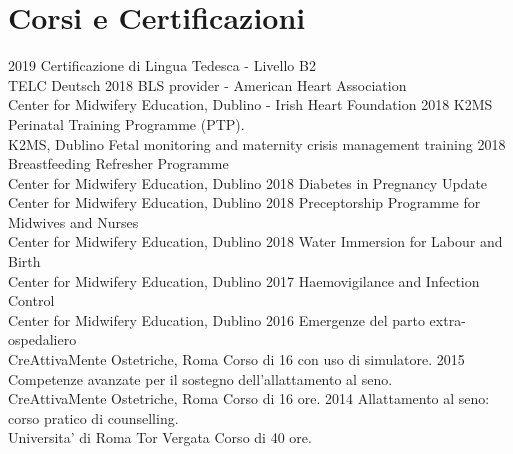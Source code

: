 \documentclass[11pt]{friggeri-cv}
\begin{document}
\section{Corsi e Certificazioni}
\begin{entrylist}
  \entry
    {2019}
    {Certificazione di Lingua Tedesca - Livello B2}
    {\\TELC Deutsch}
    {\vspace{-10pt}}
  \entry
    {2018}
    {BLS provider - American Heart Association}
    {\\Center for Midwifery Education, Dublino - Irish Heart Foundation}
    {\vspace{-10pt}}
  \entry
    {2018}
    {K2MS Perinatal Training Programme (PTP).}
    {\\K2MS, Dublino}
    {Fetal monitoring and maternity crisis management training}
  \entry
    {2018}
    {Breastfeeding Refresher Programme}
    {\\Center for Midwifery Education, Dublino}
    {\vspace{-10pt}}
  \entry
    {2018}
    {Diabetes in Pregnancy Update}
    {\\Center for Midwifery Education, Dublino}
    {\vspace{-10pt}}
  \entry
    {2018}
    {Preceptorship Programme for Midwives and Nurses}
    {\\Center for Midwifery Education, Dublino}
    {\vspace{-10pt}}
  \entry
    {2018}
    {Water Immersion for Labour and Birth}
    {\\Center for Midwifery Education, Dublino}
    {\vspace{-10pt}}
  \entry
    {2017}
    {Haemovigilance and Infection Control}
    {\\Center for Midwifery Education, Dublino}
    {\vspace{-10pt}}
  \entry
    {2016}
    {Emergenze del parto extra-ospedaliero}
    {\\CreAttivaMente Ostetriche, Roma}
    {Corso di 16 con uso di simulatore.}
  \entry
    {2015}
    {Competenze avanzate per il sostegno dell’allattamento al seno.}
    {\\CreAttivaMente Ostetriche, Roma }
    {Corso di 16 ore.}
  \entry
    {2014}
    {Allattamento al seno: corso pratico di counselling.}
    {\\Universita' di Roma Tor Vergata}
    {Corso di 40 ore.}
\end{entrylist}

\newpage
\end{document}

